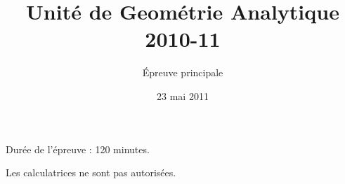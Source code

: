 



\title{Unité de Geométrie Analytique  2010-11 }
\author{Épreuve principale }
\date{23 mai 2011}


\maketitle


\vspace{1cm}

Durée de l'épreuve : 120 minutes.  

Les calculatrices ne sont pas autorisées.   

\vspace{1cm}














\newpage





\corrChapitre{}



